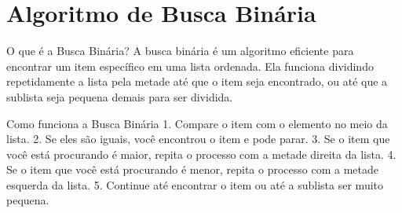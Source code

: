 \section{Algoritmo de Busca Binária}

\begin{frame}{O que é a Busca Binária?}
A busca binária é um algoritmo eficiente para encontrar um item específico em uma lista ordenada. Ela funciona dividindo repetidamente a lista pela metade até que o item seja encontrado, ou até que a sublista seja pequena demais para ser dividida.
\end{frame}

\begin{frame}{Como funciona a Busca Binária}
1. Compare o item com o elemento no meio da lista.
2. Se eles são iguais, você encontrou o item e pode parar.
3. Se o item que você está procurando é maior, repita o processo com a metade direita da lista.
4. Se o item que você está procurando é menor, repita o processo com a metade esquerda da lista.
5. Continue até encontrar o item ou até a sublista ser muito pequena.
\end{frame}
